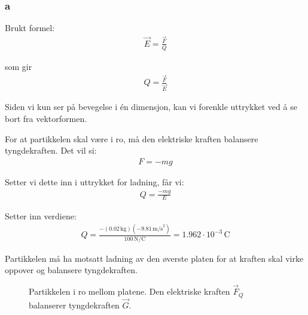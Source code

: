 \subsubsection{a}

Brukt formel:
\begin{align}
\vec{E} = \frac{\vec{F}}{Q}
\end{align}

som gir
\begin{align}
Q = \frac{\vec{F}}{\vec{E}}
\end{align}

Siden vi kun ser på bevegelse i én dimensjon, kan vi forenkle uttrykket ved å se bort fra vektorformen.

For at partikkelen skal være i ro, må den elektriske kraften balansere tyngdekraften. Det vil si:
\begin{align}
F = -mg
\end{align}

Setter vi dette inn i uttrykket for ladning, får vi:
\begin{align}
Q = \frac{-mg}{E}
\end{align}

Setter inn verdiene:
\begin{align}
Q = \frac{-(0.02\,\text{kg})(-9.81\,\text{m/s}^2)}{100\,\text{N/C}} = 1.962 \cdot 10^{-3}\,\text{C}
\end{align}

Partikkelen må ha motsatt ladning av den øverste platen for at kraften skal virke oppover og balansere tyngdekraften.

\begin{figure}[H]
\centering
{}
\caption{Partikkelen i ro mellom platene. Den elektriske kraften $\vec{F}_Q$ balanserer tyngdekraften $\vec{G}$.}
\end{figure}